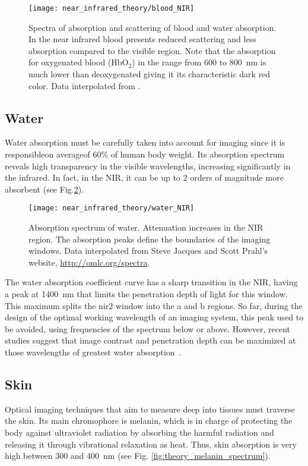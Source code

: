 \begin{figure}
\centering
\texttt{[image: near\_infrared\_theory/blood\_NIR]}
\caption[Absorption and scattering spectra of blood]{Spectra of absorption and scattering of blood and water absorption. In the near infrared blood presents reduced scattering and less absorption compared to the visible region. Note that the absorption for oxygenated blood ($\mathrm{HbO_2}$) in the range from 600 to \SI{800}{\nm} is much lower than deoxygenated giving it its characteristic dark red color. Data interpolated from \cite{Bosschaart2014}.}
\label{fig:theory_blood_spectrum} 
\end{figure}


\subsection{Water}
Water absorption must be carefully taken into account for imaging since it is responsible\textemdash on average\textemdash of 60\% of human body weight. Its absorption spectrum reveals high transparency in the visible wavelengths, increasing significantly in the infrared. In fact, in the NIR, it can be up to 2 orders of magnitude more absorbent (see Fig.\ref{fig:theory_water_spectrum}). 

\begin{figure}[]
\centering
\texttt{[image: near\_infrared\_theory/water\_NIR]}
\caption[Absorption spectrum of water.]{Absorption spectrum of water. Attenuation increases in the NIR region. The absorption peaks define the boundaries of the imaging windows. Data interpolated from Steve Jacques and Scott Prahl's website, \url{http://omlc.org/spectra}. }
\label{fig:theory_water_spectrum} 
\end{figure}

The water absorption coefficient curve has a sharp transition in the NIR, having a peak at \SI{1400}{\nm} that limits the penetration depth of light for this window. This maximum splits the \gls{nir2} window into the a and b regions. So far, during the design of the optimal working wavelength of an imaging system, this peak used to be avoided, using frequencies of the spectrum below or above. However, recent studies suggest that image contrast and penetration depth can be maximized at those wavelengths of greatest water absorption~\cite{Tanzid2016,Carr2018}.



\subsection{Skin}
Optical imaging techniques that aim to measure deep into tissues must traverse the skin. Its main chromophore is melanin, which is in charge of protecting the body against ultraviolet radiation by absorbing the harmful radiation and releasing it through vibrational relaxation as heat. Thus, skin absorption is very high between 300 and \SI{400}{\nm} (see Fig. \ref{fig:theory_melanin_spectrum}). 

